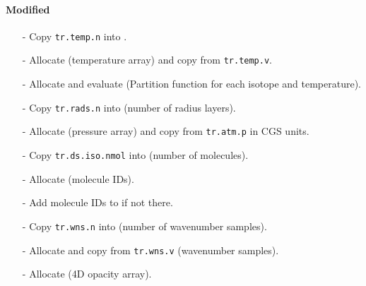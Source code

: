 \documentclass[letterpaper,12pt]{article}
\begin{document}
\paragraph{Modified}
\begin{enumerate}[leftmargin=10pt, noitemsep, parsep=0pt, topsep=0ex]
\item[-] Copy {\tt tr.temp.n} into .
\item[-] Allocate  (temperature array) and copy from {\tt tr.temp.v}.
\item[-] Allocate and evaluate  (Partition function for each isotope and temperature).
\item[-] Copy {\tt tr.rads.n} into  (number of radius layers).
\item[-] Allocate  (pressure array) and copy from {\tt tr.atm.p} in CGS units.
\item[-] Copy {\tt tr.ds.iso.nmol} into  (number of molecules).
\item[-] Allocate  (molecule IDs).
\item[-] Add molecule IDs to  if not there.
\item[-] Copy {\tt tr.wns.n} into  (number of wavenumber samples).
\item[-] Allocate  and copy from {\tt tr.wns.v} (wavenumber samples).
\item[-] Allocate  (4D opacity array).
\end{enumerate}
\end{document}
